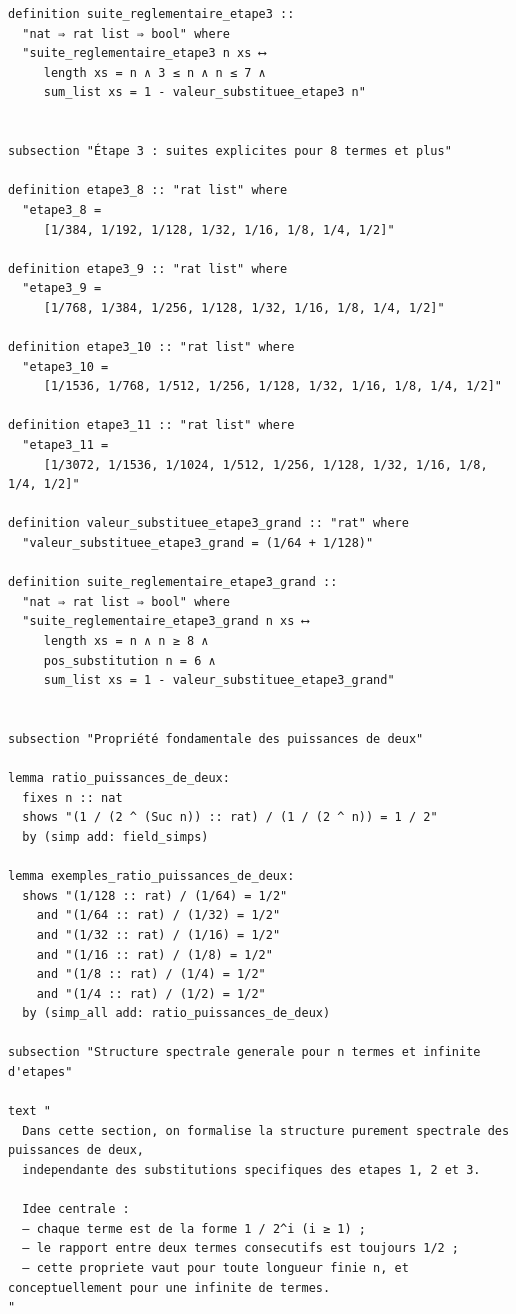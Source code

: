 \documentclass[a4paper,11pt]{article}
\begin{document}
\begin{holcode}[title={\textcolor{white}{Fichier : methode\_de\_philippot.thy -- COMPLET}}]
\begin{lstlisting}
definition suite_reglementaire_etape3 ::
  "nat ⇒ rat list ⇒ bool" where
  "suite_reglementaire_etape3 n xs ⟷
     length xs = n ∧ 3 ≤ n ∧ n ≤ 7 ∧
     sum_list xs = 1 - valeur_substituee_etape3 n"


subsection "Étape 3 : suites explicites pour 8 termes et plus"

definition etape3_8 :: "rat list" where
  "etape3_8 =
     [1/384, 1/192, 1/128, 1/32, 1/16, 1/8, 1/4, 1/2]"

definition etape3_9 :: "rat list" where
  "etape3_9 =
     [1/768, 1/384, 1/256, 1/128, 1/32, 1/16, 1/8, 1/4, 1/2]"

definition etape3_10 :: "rat list" where
  "etape3_10 =
     [1/1536, 1/768, 1/512, 1/256, 1/128, 1/32, 1/16, 1/8, 1/4, 1/2]"

definition etape3_11 :: "rat list" where
  "etape3_11 =
     [1/3072, 1/1536, 1/1024, 1/512, 1/256, 1/128, 1/32, 1/16, 1/8, 1/4, 1/2]"

definition valeur_substituee_etape3_grand :: "rat" where
  "valeur_substituee_etape3_grand = (1/64 + 1/128)"

definition suite_reglementaire_etape3_grand ::
  "nat ⇒ rat list ⇒ bool" where
  "suite_reglementaire_etape3_grand n xs ⟷
     length xs = n ∧ n ≥ 8 ∧
     pos_substitution n = 6 ∧
     sum_list xs = 1 - valeur_substituee_etape3_grand"


subsection "Propriété fondamentale des puissances de deux"

lemma ratio_puissances_de_deux:
  fixes n :: nat
  shows "(1 / (2 ^ (Suc n)) :: rat) / (1 / (2 ^ n)) = 1 / 2"
  by (simp add: field_simps)

lemma exemples_ratio_puissances_de_deux:
  shows "(1/128 :: rat) / (1/64) = 1/2"
    and "(1/64 :: rat) / (1/32) = 1/2"
    and "(1/32 :: rat) / (1/16) = 1/2"
    and "(1/16 :: rat) / (1/8) = 1/2"
    and "(1/8 :: rat) / (1/4) = 1/2"
    and "(1/4 :: rat) / (1/2) = 1/2"
  by (simp_all add: ratio_puissances_de_deux)

subsection "Structure spectrale generale pour n termes et infinite d'etapes"

text "
  Dans cette section, on formalise la structure purement spectrale des puissances de deux,
  independante des substitutions specifiques des etapes 1, 2 et 3.

  Idee centrale :
  – chaque terme est de la forme 1 / 2^i (i ≥ 1) ;
  – le rapport entre deux termes consecutifs est toujours 1/2 ;
  – cette propriete vaut pour toute longueur finie n, et conceptuellement pour une infinite de termes.
"


\end{lstlisting}
\end{holcode}
\end{document}
